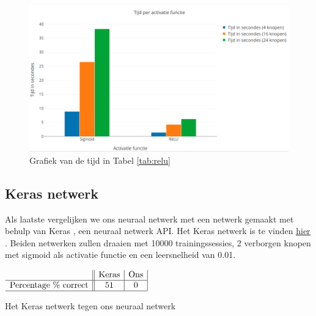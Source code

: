 \clearpage
\begin{figure}[ht!]
    \centering
    \includegraphics[scale=0.3]{graphs/time.png}
    \caption{Grafiek van de tijd in Tabel \ref{tab:relu}}
    \label{fig:relutime}
\end{figure}

\subsection{Keras netwerk}
Als laatste vergelijken we ons neuraal netwerk met een netwerk gemaakt met behulp van Keras \cite{keras}, een neuraal netwerk API. Het Keras netwerk is te vinden \href{http://liacs.leidenuniv.nl/~kosterswa/AI/samplekeras.tgz}{\underline{hier}} \cite{assignment}. 
Beiden netwerken zullen draaien met 10000 trainingssessies, 2 verborgen knopen met sigmoid als activatie functie en een leersnelheid van 0.01.

\begin{table}[ht]
    \centering
      $\begin{array}{l || c | c | c | c}
                                     & \text{Keras} & \text{Ons} \\ \hline
        \text{Percentage \% correct} & 51 & 0 \\ \hline
      \end{array}$
    \caption{Het Keras netwerk tegen ons neuraal netwerk}
    \label{tab:keras}
\end{table}